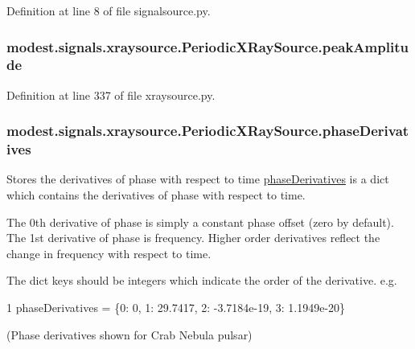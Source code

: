 Definition at line 8 of file signalsource.\+py.

\subsubsection[{\texorpdfstring{peak\+Amplitude}{peakAmplitude}}]{\setlength{\rightskip}{0pt plus 5cm}modest.\+signals.\+xraysource.\+Periodic\+X\+Ray\+Source.\+peak\+Amplitude}\hypertarget{classmodest_1_1signals_1_1xraysource_1_1PeriodicXRaySource_ab9ca2f0588f7e2f23c5301e05070fe99}{}\label{classmodest_1_1signals_1_1xraysource_1_1PeriodicXRaySource_ab9ca2f0588f7e2f23c5301e05070fe99}


Definition at line 337 of file xraysource.\+py.

\subsubsection[{\texorpdfstring{phase\+Derivatives}{phaseDerivatives}}]{\setlength{\rightskip}{0pt plus 5cm}modest.\+signals.\+xraysource.\+Periodic\+X\+Ray\+Source.\+phase\+Derivatives}\hypertarget{classmodest_1_1signals_1_1xraysource_1_1PeriodicXRaySource_ad885c269b3b042b3d094412683ef3476}{}\label{classmodest_1_1signals_1_1xraysource_1_1PeriodicXRaySource_ad885c269b3b042b3d094412683ef3476}


Stores the derivatives of phase with respect to time  \hyperlink{classmodest_1_1signals_1_1xraysource_1_1PeriodicXRaySource_ad885c269b3b042b3d094412683ef3476}{phase\+Derivatives} is a dict which contains the derivatives of phase with respect to time. 

The 0th derivative of phase is simply a constant phase offset (zero by default). The 1st derivative of phase is frequency. Higher order derivatives reflect the change in frequency with respect to time.

The dict keys should be integers which indicate the order of the derivative. e.\+g. 
\begin{DoxyCode}
1 phaseDerivatives = \{0: 0, 1: 29.7417, 2: -3.7184e-19, 3: 1.1949e-20\}
\end{DoxyCode}
 (Phase derivatives shown for Crab Nebula pulsar) 

